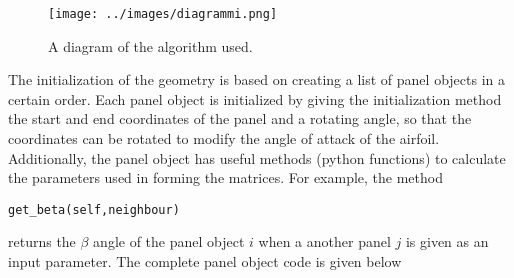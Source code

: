 \documentclass[a4paper,12pt]{article}
\begin{document}
\begin{figure}[H]
\centering
  \texttt{[image: ../images/diagrammi.png]}
\caption{A diagram of the algorithm used.}
\label{fig:diagrammi}
\end{figure}

The initialization of the geometry is based on creating a list of panel objects in a certain order. Each panel object is initialized by giving the initialization method the start and end coordinates of the panel and a rotating angle, so that the coordinates can be rotated to modify the angle of attack of the airfoil. Additionally, the panel object has useful methods (python functions) to calculate the parameters used in forming the matrices. For example, the method \begin{verbatim}get_beta(self,neighbour)\end{verbatim} 
returns the $\beta$ angle of the panel object $i$ when a another panel $j$ is given as an input parameter. The complete panel object code is given below
\end{document}
